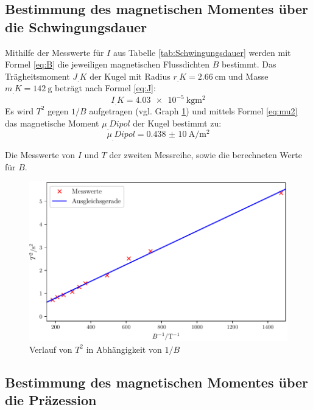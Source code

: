 \subsection{Bestimmung des magnetischen Momentes über die Schwingungsdauer}

Mithilfe der Messwerte für $I$ aus Tabelle \ref{tab:Schwingungsdauer} werden mit Formel \eqref{eq:B} die jeweiligen magnetischen Flussdichten $B$ bestimmt. Das Trägheitsmoment $J_.K$ der Kugel mit Radius $r_.K = \SI{2,66}{\centi\metre}$ und Masse $m_.K = \SI{142}{\gram}$ beträgt nach Formel \eqref{eq:J}:
\begin{equation*}
I_.K = \SI{4,03e-5}{\kilogram\metre\squared}
\end{equation*}
Es wird $T^2$ gegen $1/B$ aufgetragen (vgl. Graph \ref{fig:Schwingungsdauer}) und mittels Formel \eqref{eq:mu2} das magnetische Moment $\mu_.{Dipol}$ der Kugel bestimmt zu:
\begin{equation*}
\mu_.{Dipol} = \SI{0,438(10)}{\ampere\per\metre\squared}
\end{equation*}  
\begin{table}
  	\centering
  	\caption{Die Messwerte von $I$ und $T$ der zweiten Messreihe, sowie die berechneten Werte für $B$.}
  	\label{tab:Schwingungsdauer}
\end{table}
\begin{figure}
	\centering
	\includegraphics[scale = 1,keepaspectratio]
	{content/images/Schwingungsdauer.pdf}
	\caption{Verlauf von $T^2$ in Abhängigkeit von $1/B$}
	\label{fig:Schwingungsdauer}
\end{figure}

\subsection{Bestimmung des magnetischen Momentes über die Präzession}


